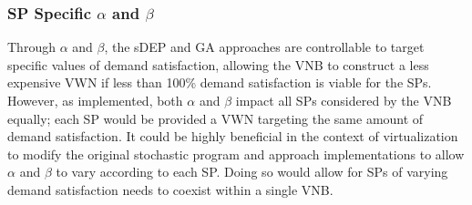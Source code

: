 \documentclass[12pt,dvipsnames]{report}
\begin{document}
\subsubsection{SP Specific $\alpha$ and $\beta$}

Through $\alpha$ and $\beta$, the sDEP and GA approaches are controllable to target specific values of demand satisfaction, allowing the VNB to construct a less expensive VWN if less than 100\% demand satisfaction is viable for the SPs.  However, as implemented, both $\alpha$ and $\beta$ impact all SPs considered by the VNB equally; each SP would be provided a VWN targeting the same amount of demand satisfaction.  It could be highly beneficial in the context of virtualization to modify the original stochastic program and approach implementations to allow $\alpha$ and $\beta$ to vary according to each SP.  Doing so would allow for SPs of varying demand satisfaction needs to coexist within a single VNB.

\fi
\fi



\end{document}
